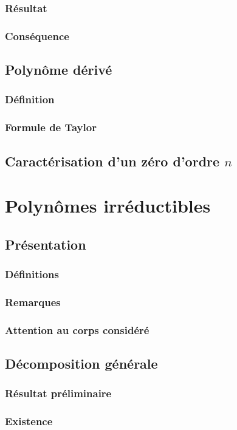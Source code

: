 \documentclass[12pt,a4paper,french]{book}
\begin{document}
			\subsubsection{Résultat}
			\subsubsection{Conséquence}
		\subsection{Polynôme dérivé}
			\subsubsection{Définition}
			\subsubsection{Formule de Taylor}
		\subsection{Caractérisation d'un zéro d'ordre $n$}
	\section{Polynômes irréductibles}
		\subsection{Présentation}
			\subsubsection{Définitions}
			\subsubsection{Remarques}
			\subsubsection{Attention au corps considéré}
		\subsection{Décomposition générale}
			\subsubsection{Résultat préliminaire}
			\subsubsection{Existence}
\end{document}
